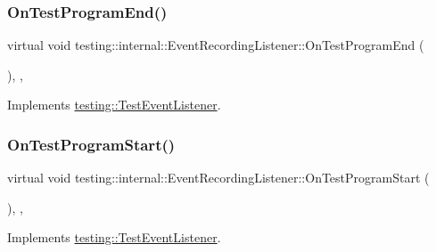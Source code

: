 \subsubsection{\texorpdfstring{OnTestProgramEnd()}{OnTestProgramEnd()}}
{\footnotesize\ttfamily virtual void testing\+::internal\+::\+Event\+Recording\+Listener\+::\+On\+Test\+Program\+End (\begin{DoxyParamCaption}\item[{const \mbox{\hyperlink{classtesting_1_1UnitTest}{Unit\+Test}} \&}]{ }\end{DoxyParamCaption})\hspace{0.3cm}{\ttfamily [inline]}, {\ttfamily [protected]}, {\ttfamily [virtual]}}



Implements \mbox{\hyperlink{classtesting_1_1TestEventListener_ad15b6246d94c268e233487a86463ef3d}{testing\+::\+Test\+Event\+Listener}}.

\mbox{\label{classtesting_1_1internal_1_1EventRecordingListener_aff89fdd3ae889a54a2ba2f3d4c98d3f6}} 
\subsubsection{\texorpdfstring{OnTestProgramStart()}{OnTestProgramStart()}}
{\footnotesize\ttfamily virtual void testing\+::internal\+::\+Event\+Recording\+Listener\+::\+On\+Test\+Program\+Start (\begin{DoxyParamCaption}\item[{const \mbox{\hyperlink{classtesting_1_1UnitTest}{Unit\+Test}} \&}]{ }\end{DoxyParamCaption})\hspace{0.3cm}{\ttfamily [inline]}, {\ttfamily [protected]}, {\ttfamily [virtual]}}



Implements \mbox{\hyperlink{classtesting_1_1TestEventListener_a5f6c84f39851e8a603a2d2e10063816b}{testing\+::\+Test\+Event\+Listener}}.

\mbox{\label{classtesting_1_1internal_1_1EventRecordingListener_aebd488b780fc172d6058ca07ca8f7145}} 
